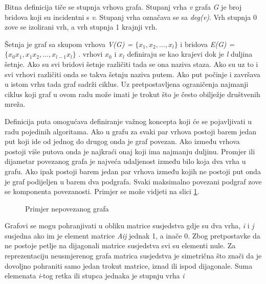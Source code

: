 Bitna definicija tiče se stupnja vrhova grafa. Stupanj vrha \textit{v} grafa \textit{G} je broj bridova koji su incidentni s \textit{v}. Stupanj vrha označava se sa \textit{deg(v)}. Vrh stupnja 0 zove se izolirani vrh, a vrh stupnja 1 krajnji vrh. \cite{nakic_pavcevic_2019}

Šetnja je graf sa skupom vrhova \textit{V(G) = $ \{x_{1},x_{2},...,x_{l}\} $ } i bridova \textit{E(G) = $ \{x_{0}x_{1},x_{1}x_{2},...,x_{l-1}x_{l}\} $ }. vrhovi $ x_{0} $ i $ x_{l} $ definiraju se kao krajevi dok je \textit{l} duljina šetnje. Ako su svi bridovi šetnje različiti tada se ona naziva staza. Ako su uz to i svi vrhovi različiti onda se takva šetnju naziva putem. Ako put počinje i završava u istom vrhu tada graf sadrži ciklus. Uz pretpostavljena ograničenja najmanji ciklus koji graf u ovom radu može imati je trokut što je često obilježje društvenih mreža.

Definicija puta omogućava definiranje važnog koncepta koji će se pojavljivati u radu pojedinih algoritama. Ako u grafu za svaki par vrhova postoji barem jedan put koji ide od jednog do drugog onda je graf povezan. Ako između vrhova postoji više putova onda je najkraći onaj koji ima najmanju duljinu. Promjer ili dijametar povezanog grafa je najveća udaljenost između bilo koja dva vrha u grafu. Ako ipak postoji barem jedan par vrhova između kojih ne postoji put onda je graf podijeljen u barem dva podgrafa. Svaki maksimalno povezani podgraf zove se komponenta povezanosti. Primjer se može vidjeti na slici \ref{fig:graph}.

\begin{figure}
	\caption{Primjer nepovezanog grafa}
	\label{fig:graph}
\end{figure}

Grafovi se mogu pohranjivati u obliku matrice susjedstva gdje su dva vrha, \textit{i} i \textit{j} susjedna ako im je element matrice \textit{A{ij}} jednak 1, a inače 0. Zbog pretpostavke da ne postoje petlje na dijagonali matrice susjedstva svi su elementi nule. Za reprezentaciju neusmjerenog grafa matrica susjedstva je simetrična što znači da je dovoljno pohraniti samo jedan trokut matrice, iznad ili ispod dijagonale. Suma elemenata \textit{i}-tog retka ili stupca jednaka je stupnju vrha \textit{i}

